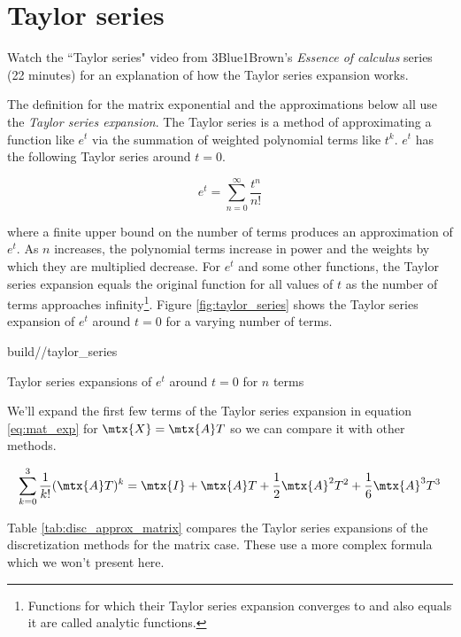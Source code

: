 \section{Taylor series}

\begin{remark}
  Watch the ``Taylor series" video from 3Blue1Brown's \textit{Essence of
  calculus} series (22 minutes) \cite{bib:calculus_taylor_series} for an
  explanation of how the Taylor series expansion works.
\end{remark}

The definition for the matrix exponential and the approximations below all use
the \textit{Taylor series expansion}. The Taylor series is a method of
approximating a function like $e^t$ via the summation of weighted polynomial
terms like $t^k$. $e^t$ has the following Taylor series around $t = 0$.

\begin{equation*}
  e^t = \sum_{n = 0}^\infty \frac{t^n}{n!}
\end{equation*}

where a finite upper bound on the number of terms produces an approximation of
$e^t$. As $n$ increases, the polynomial terms increase in power and the weights
by which they are multiplied decrease. For $e^t$ and some other functions, the
Taylor series expansion equals the original function for all values of $t$ as
the number of terms approaches infinity\footnote{Functions for which their
Taylor series expansion converges to and also equals it are called analytic
functions.}. Figure \ref{fig:taylor_series} shows the Taylor series expansion of
$e^t$ around $t = 0$ for a varying number of terms.

\begin{svg}{build/\chapterpath/taylor_series}
  \caption{Taylor series expansions of $e^t$ around $t = 0$ for $n$ terms}
  \label{fig:taylor_series}
\end{svg}

We'll expand the first few terms of the Taylor series expansion in equation
\eqref{eq:mat_exp} for $\mtx{X} = \mtx{A}T$ so we can compare it with other
methods.

\begin{equation*}
  \sum_{k=0}^3 \frac{1}{k!} (\mtx{A}T)^k = \mtx{I} + \mtx{A}T +
    \frac{1}{2}\mtx{A}^2T^2 + \frac{1}{6}\mtx{A}^3T^3
\end{equation*}

Table \ref{tab:disc_approx_matrix} compares the Taylor series expansions of the
\gls{discretization} methods for the matrix case. These use a more complex
formula which we won't present here.

